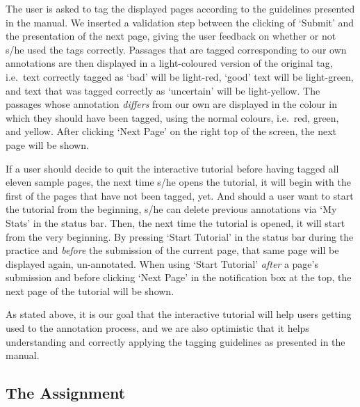 \documentclass[12pt]{article}
\begin{document}
The user is asked to tag the displayed pages according to the guidelines presented in the manual. 
We inserted a validation step between the clicking of `Submit' and the presentation of the next page, giving the user feedback on whether or not s/he used the tags correctly. 
Passages that are tagged corresponding to our own annotations are then displayed in a light-coloured version of the original tag, i.e.~text correctly tagged as `bad' will be light-red, `good' text will be light-green, and text that was tagged correctly as `uncertain' will be light-yellow.
The passages whose annotation \textit{differs} from our own are displayed in the colour in which they should have been tagged, using the normal colours, i.e.~red, green, and yellow. After clicking `Next Page' on the right top of the screen, the next page will be shown.

If a user should decide to quit the interactive tutorial before having tagged all eleven sample pages, the next time s/he opens the tutorial, it will begin with the first of the pages that have not been tagged, yet. 
And should a user want to start the tutorial from the beginning, s/he can delete previous annotations via `My Stats' in the status bar. 
Then, the next time the tutorial is opened, it will start from the very beginning. 
By pressing `Start Tutorial' in the status bar during the practice and \textit{before} the submission of the current page, that same page will be displayed again, un-annotated. 
When using `Start Tutorial' \textit{after} a page's submission and before clicking `Next Page' in the notification box at the top, the next page of the tutorial will be shown.

As stated above, it is our goal that the interactive tutorial will help users getting used to the annotation process, and we are also optimistic that it helps understanding and correctly applying the tagging guidelines as presented in the manual.


\subsection{The Assignment}
\end{document}
